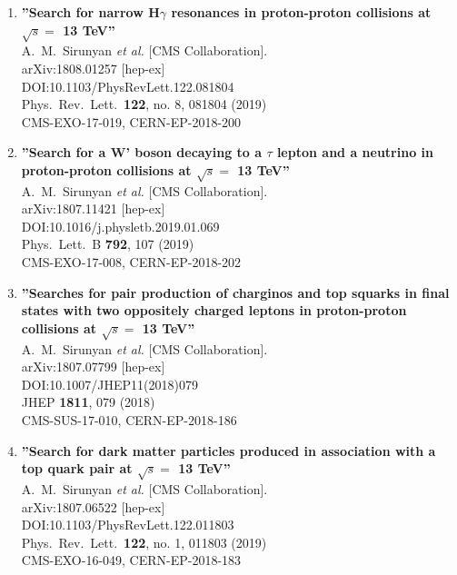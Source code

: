 \begin{enumerate}
\item%
{\bf ''Search for narrow H$\gamma$ resonances in proton-proton collisions at $\sqrt{s} =$ 13 TeV''}
  \\{}A.~M.~Sirunyan {\it et al.} [CMS Collaboration].
  \\{}arXiv:1808.01257 [hep-ex]
  \\{}DOI:10.1103/PhysRevLett.122.081804
  \\{}Phys.\ Rev.\ Lett.\  {\bf 122}, no. 8, 081804 (2019)
  \\{}CMS-EXO-17-019, CERN-EP-2018-200

\item%
{\bf ''Search for a W' boson decaying to a $\tau$ lepton and a neutrino in proton-proton collisions at $\sqrt{s} =$ 13 TeV''}
  \\{}A.~M.~Sirunyan {\it et al.} [CMS Collaboration].
  \\{}arXiv:1807.11421 [hep-ex]
  \\{}DOI:10.1016/j.physletb.2019.01.069
  \\{}Phys.\ Lett.\ B {\bf 792}, 107 (2019)
  \\{}CMS-EXO-17-008, CERN-EP-2018-202

\item%
{\bf ''Searches for pair production of charginos and top squarks in final states with two oppositely charged leptons in proton-proton collisions at $\sqrt{s}=$ 13 TeV''}
  \\{}A.~M.~Sirunyan {\it et al.} [CMS Collaboration].
  \\{}arXiv:1807.07799 [hep-ex]
  \\{}DOI:10.1007/JHEP11(2018)079
  \\{}JHEP {\bf 1811}, 079 (2018)
  \\{}CMS-SUS-17-010, CERN-EP-2018-186

\item%
{\bf ''Search for dark matter particles produced in association with a top quark pair at $\sqrt{s} =$ 13 TeV''}
  \\{}A.~M.~Sirunyan {\it et al.} [CMS Collaboration].
  \\{}arXiv:1807.06522 [hep-ex]
  \\{}DOI:10.1103/PhysRevLett.122.011803
  \\{}Phys.\ Rev.\ Lett.\  {\bf 122}, no. 1, 011803 (2019)
  \\{}CMS-EXO-16-049, CERN-EP-2018-183


\end{enumerate}
